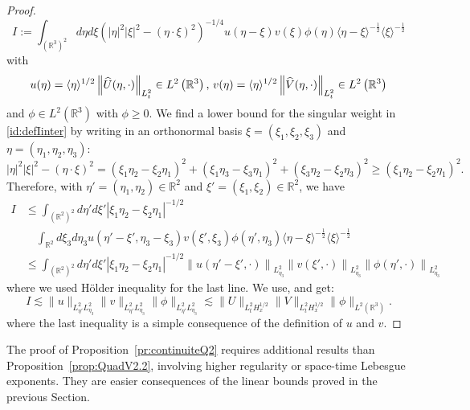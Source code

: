 \documentclass[10pt]{amsart}
\theoremstyle{definition}\newtheorem{defi}[theo]{Definition}\newtheorem{rema}[theo]{Remark}\newtheorem{exam}[theo]{Example}\newtheorem{exem}[theo]{Example}\newtheorem{nota}[theo]{Notation}
\newcommand{\R}{\mathbb{R}}
\let\oldhat\hat
\renewcommand*{\hat}[1]{\mathchoice{\widehat{#1}}{\widehat{#1}}{\oldhat{#1}}{\oldhat{#1}}}
\begin{document}
\begin{proof}
\begin{equation} \label{id:defIinter}
I := \int_{\left(\R^3\right)^2} d\eta d\xi \left(|\eta|^2|\xi|^2 - \left(\eta\cdot\xi\right)^2\right)^{-1/4} u(\eta-\xi) v(\xi) \phi(\eta) \langle \eta-\xi\rangle^{-\frac 12}\langle \xi \rangle^{-\frac 12}
\end{equation}
with
\[
u(\eta)=\langle \eta \rangle^{1/2}\left\|\hat U(\eta,\cdot)\right\|_{L^2_t}\in L^2\left(\R^3\right),\, v(\eta)=\langle \eta \rangle^{1/2} \left\|\hat V(\eta,\cdot)\right\|_{L^2_t}\in L^2\left(\R^3\right)
\]
and $\phi \in L^2(\R^3)$ with $\phi\geq0$. We find a lower bound for the singular weight in \eqref{id:defIinter} by writing in an orthonormal basis $\xi = (\xi_1,\xi_2,\xi_3)$ and $ \eta = (\eta_1,\eta_2,\eta_3)$:
\[
|\eta|^2|\xi|^2 - \left(\eta\cdot\xi\right)^2 = \left(\xi_1\eta_2 - \xi_2\eta_1\right)^2 + \left(\xi_1\eta_3 - \xi_3\eta_1\right)^2 +\left(\xi_3\eta_2 - \xi_2\eta_3\right)^2 \geq \left(\xi_1\eta_2 - \xi_2\eta_1\right)^2.
\]
Therefore, with $\eta' = (\eta_1,\eta_2)\in \R^2$ and $\xi' = (\xi_1,\xi_2)\in \R^2$, we have
\begin{align*}
I
&\leq \int_{(\R^2)^2} d\eta' d\xi' \left|\xi_1\eta_2 - \xi_2\eta_1\right|^{-1/2}\\
&\quad\int_{\R^2} d\xi_3d\eta_3 u\left(\eta'-\xi',\eta_3-\xi_3\right) v\left(\xi',\xi_3\right) \phi\left(\eta',\eta_3\right)
 \langle \eta-\xi\rangle^{-\frac 12} \langle \xi \rangle^{-\frac 12}\\
 &\leq \int_{\left(\R^2\right)^2} d\eta' d\xi' \left|\xi_1\eta_2 - \xi_2\eta_1\right|^{-1/2} \left\| u\left(\eta'-\xi',\cdot\right)\right\|_{L^2_{\eta_3}} \left\|v\left(\xi',\cdot\right)\right\|_{L^2_{\eta_3}}\left\| \phi\left(\eta',\cdot\right)\right\|_{L^2_{\eta_3}}
\end{align*}
where we used H\"older inequality for the last line. We use,\cite[Lemma~5]{lewsab2} and get:
\[
I \lesssim \|u\|_{L^2_{\eta'}L^2_{\eta_3}}\|v\|_{L^2_{\eta'}L^2_{\eta_3}}\| \phi \|_{L^2_{\eta'}L^2_{\eta_3}}\lesssim \| U \|_{L^2_{t}H^{1/2}_x}\| V\|_{L^2_{t}H^{1/2}_x}\| \phi \|_{L^2\left(\R^3\right)}.
\]
where the last inequality is a simple consequence of the definition of $u$ and $v$.
\end{proof}


The proof of Proposition~\ref{pr:continuiteQ2} requires additional results than Proposition~\ref{prop:QuadV2.2}, involving higher regularity or space-time Lebesgue exponents. They are easier consequences of the linear bounds proved in the previous Section.
\end{document}
